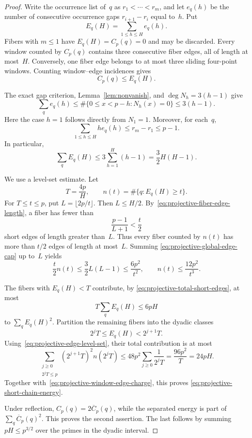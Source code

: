 \begin{proof}
Write the occurrence list of~$q$ as
$r_1<\cdots<r_m$, and let $e_q(h)$ be the number of consecutive
occurrence gaps $r_{i+1}-r_i$ equal to~$h$.  Put
\[
 E_q(H)=\sum_{1\le h\le H}e_q(h).
\]
Fibers with $m\le1$ have $E_q(H)=C_p(q)=0$ and may be discarded.
Every window counted by $C_p(q)$ contains three consecutive fiber edges,
all of length at most~$H$.  Conversely, one fiber edge belongs to at most
three sliding four-point windows.  Counting window--edge incidences gives
\begin{equation}
 C_p(q)\le E_q(H).
\label{eq:projective-window-edge-charge}
\end{equation}

The exact gap criterion, Lemma~\ref{lem:nonvanish}, and
$\deg N_h=3(h-1)$ give
\begin{equation}
 \sum_q e_q(h)
 \le\#\{0\le x<p-h:N_h(x)=0\}
 \le3(h-1).
\label{eq:projective-global-edge-cap}
\end{equation}
Here the case $h=1$ follows directly from $N_1=1$.
Moreover, for each~$q$,
\begin{equation}
 \sum_{1\le h\le H}h e_q(h)
 \le r_m-r_1\le p-1.
\label{eq:projective-fiber-edge-length}
\end{equation}
In particular,
\begin{equation}
 \sum_qE_q(H)
 \le3\sum_{h=1}^H(h-1)
 =\frac32H(H-1).
\label{eq:projective-total-short-edges}
\end{equation}

We use a level-set estimate.  Let
\[
 T=\frac{4p}{H},\qquad
 n(t)=\#\{q:E_q(H)\ge t\}.
\]
For $T\le t\le p$, put $L=\lfloor2p/t\rfloor$.
Then $L\le H/2$.  By~\eqref{eq:projective-fiber-edge-length}, a fiber
has fewer than
\[
 \frac{p-1}{L+1}<\frac t2
\]
short edges of length greater than~$L$.  Thus every fiber counted by
$n(t)$ has more than $t/2$ edges of length at most~$L$.  Summing
\eqref{eq:projective-global-edge-cap} up to~$L$ yields
\[
 \frac t2n(t)
 \le\frac32L(L-1)
 \le\frac{6p^2}{t^2},
 \qquad
 n(t)\le\frac{12p^2}{t^3}.
\label{eq:projective-edge-level-set}
\]

The fibers with $E_q(H)<T$ contribute, by
\eqref{eq:projective-total-short-edges}, at most
\[
 T\sum_qE_q(H)\le6pH
\]
to $\sum_qE_q(H)^2$.  Partition the remaining fibers into the dyadic
classes
\[
 2^jT\le E_q(H)<2^{j+1}T.
\]
Using~\eqref{eq:projective-edge-level-set}, their total contribution is
at most
\[
 \sum_{\substack{j\ge0\\2^jT\le p}}
 (2^{j+1}T)^2n(2^jT)
 \le48p^2\sum_{j\ge0}\frac1{2^jT}
 =\frac{96p^2}{T}
 =24pH.
\]
Together with~\eqref{eq:projective-window-edge-charge}, this proves
\eqref{eq:projective-short-chain-energy}.

Under reflection, $C_p(q)=2\overline C_p(q)$, while the separated energy
is part of $\sum_q\overline C_p(q)^2$.  This proves the second assertion.
The last follows by summing $pH\le p^{3/2}$ over the primes in the dyadic
interval.
\end{proof}

